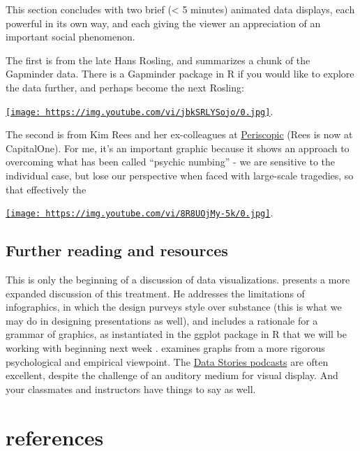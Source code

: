 \documentclass[openany]{book}
\begin{document}
This section concludes with two brief (\textless{} 5 minutes) animated data displays, each powerful in its own way, and each giving the viewer an appreciation of an important social phenomenon.

The first is from the late Hans Rosling, and summarizes a chunk of the Gapminder data. There is a Gapminder package in R if you would like to explore the data further, and perhaps become the next Rosling:

\href{https://youtu.be/jbkSRLYSojo}{\texttt{[image: https://img.youtube.com/vi/jbkSRLYSojo/0.jpg]}}.

The second is from Kim Rees and her ex-colleagues at \href{https://periscopic.com/}{Periscopic} (Rees is now at CapitalOne). For me, it's an important graphic because it shows an approach to overcoming what has been called ``psychic numbing'' - we are sensitive to the individual case, but lose our perspective when faced with large-scale tragedies, so that effectively the \citep{slovic2013psychic}

\href{https://youtu.be/8R8UOjMy-5k}{\texttt{[image: https://img.youtube.com/vi/8R8UOjMy-5k/0.jpg]}}.

\hypertarget{further-reading-and-resources}{%
\section{Further reading and resources}\label{further-reading-and-resources}}

This is only the beginning of a discussion of data visualizations. \citet{healy2018viz} presents a more expanded discussion of this treatment. He addresses the limitations of infographics, in which the design purveys style over substance (this is what we may do in designing presentations as well), and includes a rationale for a grammar of graphics, as instantiated in the ggplot package in R that we will be working with beginning next week \citep{wickham2016r}. \citet{cleveland1985graphical} examines graphs from a more rigorous psychological and empirical viewpoint. The \href{http://datastori.es/}{Data Stories podcasts} are often excellent, despite the challenge of an auditory medium for visual display. And your classmates and instructors have things to say as well.

\hypertarget{references}{%
\chapter{references}\label{references}}


\end{document}
